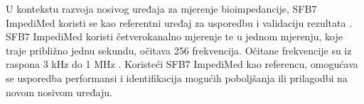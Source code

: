 \documentclass[../diplomski_rad.tex]{subfiles}
\begin{document}
U kontekstu razvoja nosivog uređaja za mjerenje bioimpedancije, SFB7 ImpediMed 
koristi se kao referentni uređaj za usporedbu i validaciju rezultata \cite{sfb7}. 
SFB7 ImpediMed koristi četverokanalno mjerenje te u jednom mjerenju, koje traje približno jednu sekundu, očitava 256 frekvencija. 
Očitane frekvencije su iz raspona 3 kHz do 1 MHz \cite{sfb7}. 
Koristeći SFB7 ImpediMed kao referencu, omogućava se usporedba performansi i identifikacija 
mogućih poboljšanja ili prilagodbi na novom nosivom uređaju. 
\end{document}
